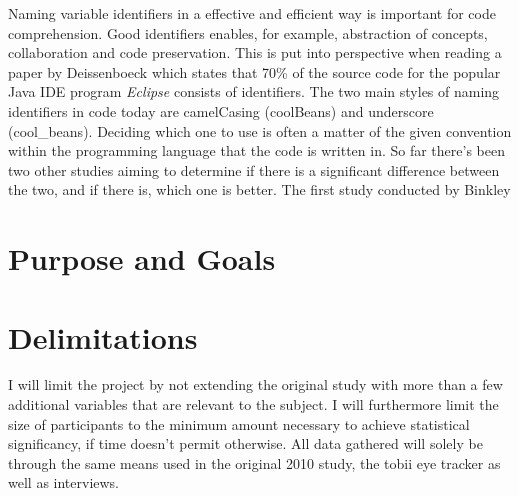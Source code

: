 \iffalse
\begin{itemize}
	\item Identifier names are important
	\item We have two identifier styles
	\item Some history 
	\item Two other studies
	\item Some background on them
	\item Reference all terms introduced
\end{itemize}
\fi

Naming variable identifiers in a effective and efficient way is important for code comprehension. Good identifiers enables, for example, abstraction of concepts, collaboration and code preservation. This is put into perspective when reading a paper by Deissenboeck \etal \cite{Concise_Naming} which states that 70\% of the source code for the popular Java IDE program \textit{Eclipse} consists of identifiers. The two main styles of naming identifiers in code today are camelCasing (\eg coolBeans) and underscore (\eg cool\_beans). Deciding which one to use is often a matter of the given convention within the programming language that the code is written in. So far there's been two other studies aiming to determine if there is a significant difference between the two, and if there is, which one is better. The first study conducted by Binkley \etal 


\section{Purpose and Goals}
\iffalse
\begin{itemize}
	\item Write about the grand scheme of things
	\item Set the correct expectations
	\item What can I expect to learn if I keep on reading?
	\item What are the success criteria for this work?
	\item How will the work be evaluated?
\end{itemize}
\fi

\section{Delimitations}
\iffalse
\begin{itemize}
	\item Scale down expectations and clarify
\end{itemize}
\fi

I will limit the project by not extending the original study with more than a few additional variables that are relevant to the subject. I will furthermore limit the size of participants to the minimum amount necessary to achieve statistical significancy, if time doesn't permit otherwise. All data gathered will solely be through the same means used in the original 2010 study, the tobii eye tracker as well as interviews.